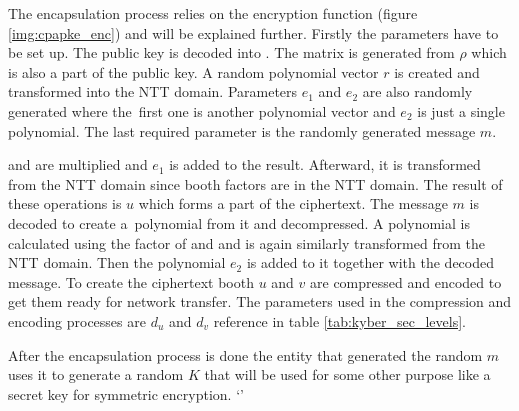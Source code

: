 The encapsulation process relies on the encryption function (figure \ref{img:cpapke_enc}) and  will be explained further. Firstly the parameters have to be set up. The public key is decoded into . The matrix  is generated from $\rho$ which is also a part of the public key. A random polynomial vector $r$ is created and transformed into the NTT domain. Parameters $e_1$ and $e_2$ are also randomly generated where the~first one is another polynomial vector and $e_2$ is just a single polynomial. The last required parameter is the randomly generated message $m$.

 and  are multiplied and $e_1$ is added to the result. Afterward, it is transformed from the NTT domain since booth factors are in the NTT domain. The result of these operations is $u$ which forms a part of the ciphertext. The message $m$ is decoded to create a~polynomial from it and decompressed. A polynomial is calculated using the factor of  and  and is again similarly transformed from the NTT domain. Then the polynomial $e_2$ is added to it together with the decoded message. To create the ciphertext booth $u$ and $v$ are compressed and encoded to get them ready for network transfer. The parameters used in the compression and encoding processes are $d_u$ and $d_v$ reference in table \ref{tab:kyber_sec_levels}.

After the encapsulation process is done the entity that generated the random $m$ uses it to generate a random $K$ that will be used for some other purpose like a secret key for symmetric encryption.
`'
